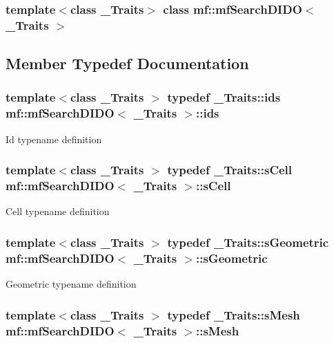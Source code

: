 \subsubsection*{template$<$class \_\-Traits$>$ class mf::mfSearchDIDO$<$ \_\-Traits $>$}



\subsection{Member Typedef Documentation}
\hypertarget{classmf_1_1mfSearchDIDO_a01104ce1f89f6f20c744a1b0f986a312}{
\subsubsection[{ids}]{\setlength{\rightskip}{0pt plus 5cm}template$<$class \_\-Traits $>$ typedef \_\-Traits::ids {\bf mf::mfSearchDIDO}$<$ \_\-Traits $>$::{\bf ids}}}
\label{classmf_1_1mfSearchDIDO_a01104ce1f89f6f20c744a1b0f986a312}
Id typename definition \hypertarget{classmf_1_1mfSearchDIDO_a1dcd18812432c1b5bd738f1f1a9eaf5a}{
\subsubsection[{sCell}]{\setlength{\rightskip}{0pt plus 5cm}template$<$class \_\-Traits $>$ typedef \_\-Traits::sCell {\bf mf::mfSearchDIDO}$<$ \_\-Traits $>$::{\bf sCell}}}
\label{classmf_1_1mfSearchDIDO_a1dcd18812432c1b5bd738f1f1a9eaf5a}
Cell typename definition \hypertarget{classmf_1_1mfSearchDIDO_ad8d6f59a3f5c291249ea4e7905b543a1}{
\subsubsection[{sGeometric}]{\setlength{\rightskip}{0pt plus 5cm}template$<$class \_\-Traits $>$ typedef \_\-Traits::sGeometric {\bf mf::mfSearchDIDO}$<$ \_\-Traits $>$::{\bf sGeometric}}}
\label{classmf_1_1mfSearchDIDO_ad8d6f59a3f5c291249ea4e7905b543a1}
Geometric typename definition \hypertarget{classmf_1_1mfSearchDIDO_af73c732f3c0a7fe85765bb4c49bd5545}{
\subsubsection[{sMesh}]{\setlength{\rightskip}{0pt plus 5cm}template$<$class \_\-Traits $>$ typedef \_\-Traits::sMesh {\bf mf::mfSearchDIDO}$<$ \_\-Traits $>$::{\bf sMesh}}}
